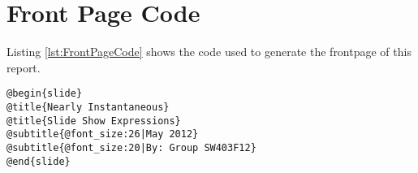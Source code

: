 \chapter{Front Page Code}
\label{AFrontPageCode}
Listing \ref{lst:FrontPageCode} shows the code used to generate the frontpage of this report.

\begin{lstlisting}[frame=single,caption=NISSE code generating the frontpage, label=lst:FrontPageCode]
@begin{slide}
@title{Nearly Instantaneous}
@title{Slide Show Expressions}
@subtitle{@font_size:26|May 2012}
@subtitle{@font_size:20|By: Group SW403F12}
@end{slide}
\end{lstlisting}